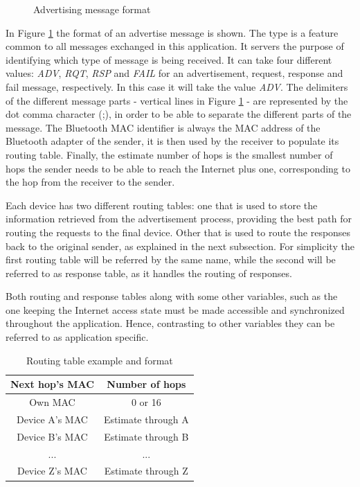\begin{figure}[ht]
   \noindent{}
	\caption{\label{fig:advmsg} Advertising message format}
\end{figure}

In Figure \ref{fig:advmsg} the format of an advertise message is shown. The type is a feature common to all messages exchanged in this application. It servers the purpose of identifying which type of message is being received. It can take four different values: \textit{ADV}, \textit{RQT}, \textit{RSP} and \textit{FAIL} for an advertisement, request, response and fail message, respectively. In this case it will take the value \textit{ADV}. The delimiters of the different message parts - vertical lines in Figure \ref{fig:advmsg} - are represented by the dot comma character (;), in order to be able to separate the different parts of the message. The Bluetooth \gls{MAC} identifier is always the \gls{MAC} address of the Bluetooth adapter of the sender, it is then used by the receiver to populate its routing table. Finally, the estimate number of hops is the smallest number of hops the sender needs to be able to reach the Internet plus one, corresponding to the hop from the receiver to the sender.

Each device has two different routing tables: one that is used to store the information retrieved from the advertisement process, providing the best path for routing the requests to the final device. Other that is used to route the responses back to the original sender, as explained in the next subsection. For simplicity the first routing table will be referred by the same name, while the second will be referred to as response table, as it handles the routing of responses. 

Both routing and response tables along with some other variables, such as the one keeping the Internet access state must be made accessible and synchronized throughout the application. Hence, contrasting to other variables they can be referred to as application specific.

\begin{table}[ht]
\centering
\bgroup
\def\arraystretch{2.5}
\begin{tabular}{|c|c|}
\hline
\textbf{Next hop's MAC} & \textbf{Number of hops} \\ \hline
Own MAC & 0 or 16 \\ \hline
Device A's MAC & Estimate through A \\ \hline
Device B's MAC & Estimate through B \\ \hline
... & ... \\ \hline
Device Z's MAC & Estimate through Z \\ \hline
\end{tabular}
\egroup
\caption{Routing table example and format}
\label{tab:routTables}
\end{table}

